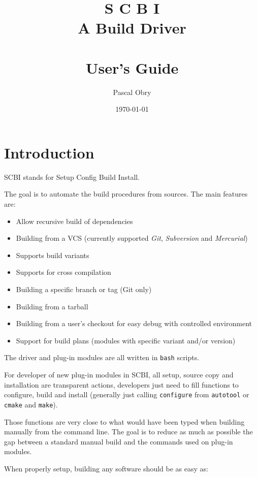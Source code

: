 \documentclass[a4paper,12pt,twoside]{article}
\title{{\Huge S C B I} \\
	{\large  A Build Driver \version} \\
	\hfill \\
	User's Guide}
\author{Pascal Obry}
\date{\today}
\newcommand{\code}[1]{\texttt{#1}}
\renewcommand{\emph}[1]{\textit{#1}}
\let\stdsection\section
\renewcommand\section{\newpage\stdsection}
\begin{document}
\maketitle

%

\tableofcontents


\section{Introduction}

SCBI stands for Setup Config Build Install.

The goal is to automate the build procedures from sources. The main features are:

\begin{itemize}
	\item Allow recursive build of dependencies
	\item Building from a VCS (currently supported \emph{Git}, \emph{Subversion} and \emph{Mercurial})
	\item Supports build variants
	\item Supports for cross compilation
	\item Building a specific branch or tag (Git only)
	\item Building from a tarball
	\item Building from a user's checkout for easy debug with controlled environment
	\item Support for build plans (modules with specific variant and/or version)
\end{itemize}

The driver and plug-in modules are all written in \code{bash} scripts.

For developer of new plug-in modules in SCBI, all setup, source copy and installation are transparent actions, developers just need to fill functions to configure, build and install (generally just calling \code{configure} from \code{autotool} or \code{cmake} and \code{make}).

Those functions are very close to what would have been typed when building manually from the command line. The goal is to reduce as much as possible the gap between a standard manual build and the commands used on plug-in modules.

When properly setup, building any software should be as easy as:
\end{document}
